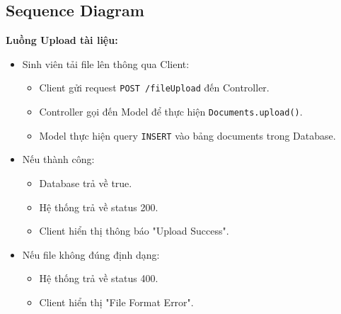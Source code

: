 \newpage
\subsection{Sequence Diagram}
\textbf{Luồng Upload tài liệu:}
\begin{itemize}
    \item Sinh viên tải file lên thông qua Client:
    \begin{itemize}
        \item Client gửi request \texttt{POST /fileUpload} đến Controller.
        \item Controller gọi đến Model để thực hiện \texttt{Documents.upload()}.
        \item Model thực hiện query \texttt{INSERT} vào bảng documents trong Database.
    \end{itemize}
    \item Nếu thành công:
    \begin{itemize}
        \item Database trả về true.
        \item Hệ thống trả về status 200.
        \item Client hiển thị thông báo "Upload Success".
    \end{itemize}
    \item Nếu file không đúng định dạng:
    \begin{itemize}
        \item Hệ thống trả về status 400.
        \item Client hiển thị "File Format Error".
    \end{itemize}
\end{itemize}

